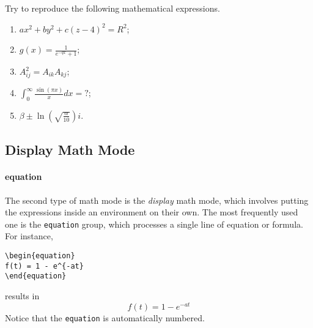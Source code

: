 \begin{exercisebox}[breakable=false]
\begin{Exercise}
Try to reproduce the following mathematical expressions.
\begin{enumerate}[label=\alph*)]
    \item $ax^2 + by^2 + c(z-4)^2 = R^2$;
    \item $g(x) = \frac{1}{e^{-qx}+1}$;
    \item $A^2_{ij} = A_{ik}A_{kj}$;
    \item $\int_0^{\infty} \frac{\sin(\pi x)}{x}dx = ?$;\footnotemark
    \item $\beta\pm\ln(\sqrt{\frac{\alpha}{10}})i$.
\end{enumerate}
\end{Exercise}
\end{exercisebox}

\subsection{Display Math Mode}

\paragraph{equation}
The second type of math mode is the \textit{display} math mode, which involves putting the expressions inside an environment on their own. The most frequently used one is the \texttt{equation} group, which processes a single line of equation or formula. For instance,
\begin{lstlisting}
\begin{equation}
f(t) = 1 - e^{-at}
\end{equation}
\end{lstlisting}
results in
\begin{equation}
f(t) = 1 - e^{-at}
\end{equation}
Notice that the \texttt{equation} is automatically numbered.

